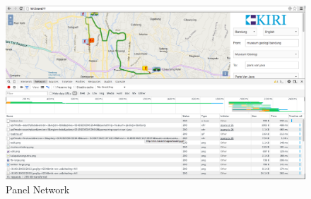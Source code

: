 \documentclass[a4paper,twoside]{article}
\begin{document}
\begin{figure}[H]
	\centering
	\includegraphics[scale=0.3]{Gambar/devtools-network}
	\caption{Panel Network} 
	\label{fig:2_devtools_network}
\end{figure}
\end{document}
